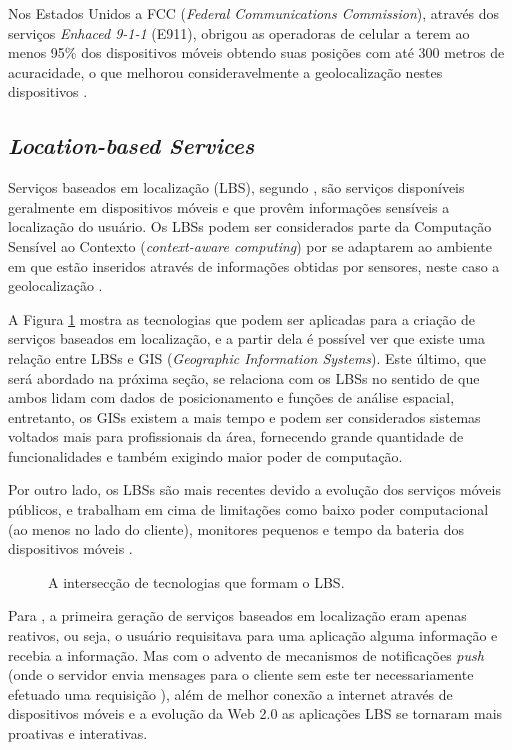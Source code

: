 \documentclass[diss]{template/setrem}
\begin{document}
Nos Estados Unidos a FCC (\emph{Federal Communications Commission}), através dos serviços \emph{Enhaced 9-1-1} (E911), obrigou as operadoras de celular a terem ao menos 95\% dos dispositivos móveis obtendo suas posições com até 300 metros de acuracidade, o que melhorou consideravelmente a geolocalização nestes dispositivos \citep{Holdener2011}.

\subsection{\textit{Location-based Services}}
\label{subsec:lbs}
Serviços baseados em localização (LBS), segundo \citet{Holdener2011, Steiniger2012}, são serviços disponíveis geralmente em dispositivos móveis e que provêm informações sensíveis a localização do usuário. Os LBSs podem ser considerados parte da Computação Sensível ao Contexto (\emph{context-aware computing}) por se adaptarem ao ambiente em que estão inseridos através de informações obtidas por sensores, neste caso a geolocalização \citep{Barkuus2003}.

A Figura \ref{fig:lbs} mostra as tecnologias que podem ser aplicadas para a criação de serviços baseados em localização, e a partir dela é possível ver que existe uma relação entre LBSs e GIS (\emph{Geographic Information Systems}). Este último, que será abordado na próxima seção, se relaciona com os LBSs no sentido de que ambos lidam com dados de posicionamento e funções de análise espacial, entretanto, os GISs existem a mais tempo e podem ser considerados sistemas voltados mais para profissionais da área, fornecendo grande quantidade de funcionalidades e também exigindo maior poder de computação. 

Por outro lado, os LBSs são mais recentes devido a evolução dos serviços móveis públicos, e trabalham em cima de limitações como baixo poder computacional (ao menos no lado do cliente), monitores pequenos e tempo da bateria dos dispositivos móveis \citep{Steiniger2012}.

\begin{figure}[!h]
    \caption{A intersecção de tecnologias que formam o LBS.}
    \label{fig:lbs}
\end{figure}

Para \citet{Shek2010}, a primeira geração de serviços baseados em localização eram apenas reativos, ou seja, o usuário requisitava para uma aplicação alguma informação e recebia a informação. Mas com o advento de mecanismos de notificações \emph{push} (onde o servidor envia mensages para o cliente sem este ter necessariamente efetuado uma requisição \citep{GSMA2003}), além de melhor conexão a internet através de dispositivos móveis e a evolução da Web 2.0 as aplicações LBS se tornaram mais proativas e interativas.
\end{document}
